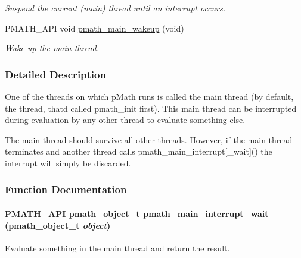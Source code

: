 \begin{CompactItemize}
\begin{CompactList}\small\item\em Suspend the current (main) thread until an interrupt occurs. \item\end{CompactList}\item 
PMATH\_\-API void \hyperlink{group__mainthread_g55431179eb0026a983b3177fba6870b6}{pmath\_\-main\_\-wakeup} (void)
\begin{CompactList}\small\item\em Wake up the main thread. \item\end{CompactList}\end{CompactItemize}


\subsubsection{Detailed Description}
One of the threads on which pMath runs is called the main thread (by default, the thread, thatd called pmath\_\-init first). This main thread can be interrupted during evaluation by any other thread to evaluate something else.

The main thread should survive all other threads. However, if the main thread terminates and another thread calls pmath\_\-main\_\-interrupt\mbox{[}\_\-wait\mbox{]}() the interrupt will simply be discarded. 

\subsubsection{Function Documentation}
\hypertarget{group__mainthread_gff368341b3f162100031fffb986bcb48}{
\paragraph[{pmath\_\-main\_\-interrupt\_\-wait}]{\setlength{\rightskip}{0pt plus 5cm}PMATH\_\-API {\bf pmath\_\-object\_\-t} pmath\_\-main\_\-interrupt\_\-wait ({\bf pmath\_\-object\_\-t} {\em object})}\hfill}
\label{group__mainthread_gff368341b3f162100031fffb986bcb48}


Evaluate something in the main thread and return the result. 

